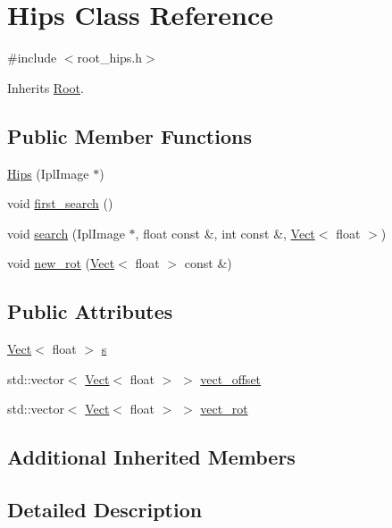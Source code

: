 \hypertarget{class_hips}{\section{Hips Class Reference}
\label{class_hips}
}


{\ttfamily \#include $<$root\+\_\+hips.\+h$>$}



Inherits \hyperlink{class_root}{Root}.

\subsection*{Public Member Functions}
\begin{DoxyCompactItemize}
\item 
\hyperlink{class_hips_a2de32180f71891e5f1cb4270422dcb1f}{Hips} (Ipl\+Image $\ast$)
\item 
void \hyperlink{class_hips_afe6adbda4359347a73c4e545ad1c7f16}{first\+\_\+search} ()
\item 
void \hyperlink{class_hips_af555079fdd63afe05341c8c31061dffd}{search} (Ipl\+Image $\ast$, float const \&, int const \&, \hyperlink{class_vect}{Vect}$<$ float $>$)
\item 
void \hyperlink{class_hips_af2791e6036567db428b87247e036fb8e}{new\+\_\+rot} (\hyperlink{class_vect}{Vect}$<$ float $>$ const \&)
\end{DoxyCompactItemize}
\subsection*{Public Attributes}
\begin{DoxyCompactItemize}
\item 
\hyperlink{class_vect}{Vect}$<$ float $>$ \hyperlink{class_hips_a9bf3db02fee9c8d80fd8e5008ae84620}{s}
\item 
std\+::vector$<$ \hyperlink{class_vect}{Vect}$<$ float $>$ $>$ \hyperlink{class_hips_a42ff186d2f751d6a24ed2b2c8cb350ad}{vect\+\_\+offset}
\item 
std\+::vector$<$ \hyperlink{class_vect}{Vect}$<$ float $>$ $>$ \hyperlink{class_hips_a704c04efaf11d71f44ee571a9ed1b6f7}{vect\+\_\+rot}
\end{DoxyCompactItemize}
\subsection*{Additional Inherited Members}


\subsection{Detailed Description}


